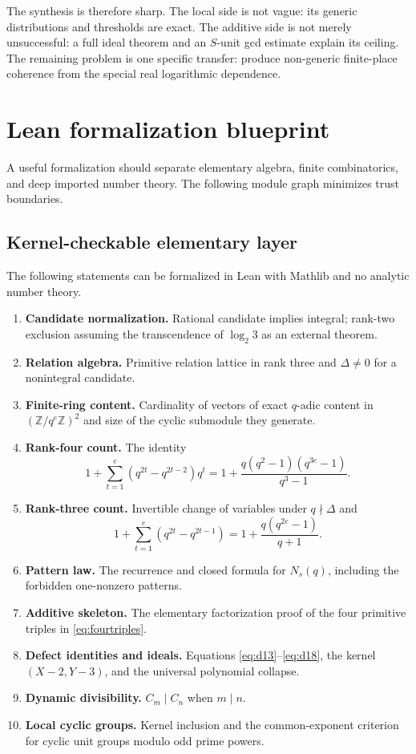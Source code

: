 \documentclass[11pt]{article}
\theoremstyle{definition}
\theoremstyle{remark}
\newcommand{\Z}{\mathbb{Z}}
\begin{document}
The synthesis is therefore sharp.  The local side is not vague: its generic distributions and
thresholds are exact.  The additive side is not merely unsuccessful: a full ideal theorem and an
$S$-unit gcd estimate explain its ceiling.  The remaining problem is one specific transfer:
produce non-generic finite-place coherence from the special real logarithmic dependence.

\section{Lean formalization blueprint}
\label{sec:lean}

A useful formalization should separate elementary algebra, finite combinatorics, and deep imported
number theory.  The following module graph minimizes trust boundaries.

\subsection{Kernel-checkable elementary layer}

The following statements can be formalized in Lean with Mathlib and no analytic number theory.
\begin{enumerate}[leftmargin=2.2em]
\item \textbf{Candidate normalization.}  Rational candidate implies integral; rank-two exclusion
      assuming the transcendence of $\log_2 3$ as an external theorem.
\item \textbf{Relation algebra.}  Primitive relation lattice in rank three and
      $\Delta\ne0$ for a nonintegral candidate.
\item \textbf{Finite-ring content.}  Cardinality of vectors of exact $q$-adic content in
      $(\Z/q^e\Z)^2$ and size of the cyclic submodule they generate.
\item \textbf{Rank-four count.}  The identity
\[
  1+\sum_{t=1}^e(q^{2t}-q^{2t-2})q^t
  =1+\frac{q(q^2-1)(q^{3e}-1)}{q^3-1}.
\]
\item \textbf{Rank-three count.}  Invertible change of variables under $q\nmid\Delta$ and
\[
  1+\sum_{t=1}^e(q^{2t}-q^{2t-1})
  =1+\frac{q(q^{2e}-1)}{q+1}.
\]
\item \textbf{Pattern law.}  The recurrence and closed formula for $N_s(q)$, including the
      forbidden one-nonzero patterns.
\item \textbf{Additive skeleton.}  The elementary factorization proof of the four primitive
      triples in \eqref{eq:fourtriples}.
\item \textbf{Defect identities and ideals.}  Equations \eqref{eq:d13}--\eqref{eq:d18}, the
      kernel $(X-2,Y-3)$, and the universal polynomial collapse.
\item \textbf{Dynamic divisibility.}  $C_m\mid C_n$ when $m\mid n$.
\item \textbf{Local cyclic groups.}  Kernel inclusion and the common-exponent criterion for
      cyclic unit groups modulo odd prime powers.
\end{enumerate}
\end{document}
